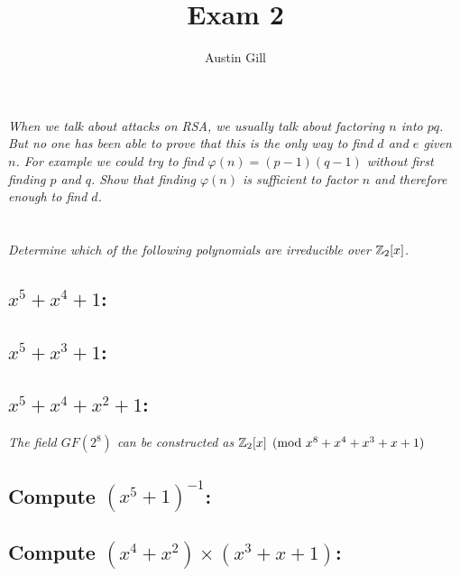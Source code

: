 \documentclass[12pt]{article}
\title{Exam 2}
\author{Austin Gill}
\begin{document}
\maketitle

\section{} \textit{When we talk about attacks on RSA, we usually talk about factoring $n$ into $pq$. But no one has been able to prove that this is the only way to find $d$ and $e$ given $n$. For example we could try to find $\varphi(n) = (p-1)(q-1)$ without first finding $p$ and $q$. Show that finding $\varphi(n)$ is sufficient to factor $n$ and therefore enough to find $d$.}

\section{} \textit{Determine which of the following polynomials are irreducible over $\mathbb{Z}_2 [x]$.}

    \subsection{$x^5 + x^4 + 1$:}
    \subsection{$x^5 + x^3 + 1$:}
    \subsection{$x^5 + x^4 + x^2 + 1$:}

    \textit{The field $GF(2^8)$ can be constructed as $\mathbb{Z}_2[x] \pmod{x^8 + x^4 + x^3 + x + 1}$}

    \subsection{Compute ${(x^5 + 1)}^{-1}$:}
    \subsection{Compute $(x^4 + x^2) \times (x^3 + x + 1)$:}
\end{document}
